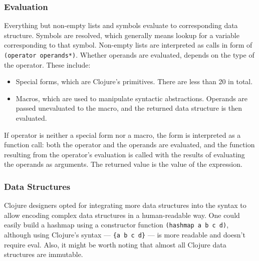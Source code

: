 \documentclass[11pt]{scrartcl}
\begin{document}
\subsubsection{Evaluation}
Everything but non-empty lists and symbols evaluate to corresponding data
structure.
Symbols are resolved, which generally means lookup for a variable corresponding
to that symbol.
Non-empty lists are interpreted as calls in form of \lstinline|(operator operands*)|.
Whether operands are evaluated, depends on the type of the operator.
These include:
\begin{itemize}
  \item Special forms, which are Clojure’s primitives. There are  less than 20
    in total.
  \item Macros, which are used to manipulate syntactic abstractions. Operands
    are passed unevaluated to the macro, and the returned data structure is then
    evaluated.
\end{itemize}
If operator is neither a special form nor a macro, the form is interpreted as a
function call: both the operator and the operands are evaluated, and the
function resulting from the operator’s evaluation is called with the results of
evaluating the operands as arguments.
The returned value is the value of the expression.

\subsubsection{Data Structures}
Clojure designers opted for integrating more data structures into the syntax to
allow encoding complex data structures in a human-readable way.
One could easily build a hashmap using a constructor function
\lstinline$(hashmap a b c d)$, although using Clojure’s syntax ---
\lstinline${a b c d}$ --- is more readable and doesn’t require eval.
Also, it might be worth noting that almost all Clojure data structures are
immutable.
\end{document}
